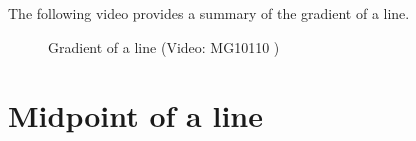         \label{m39108*eip-611}The following video provides a summary of the gradient of a line.

    \setcounter{subfigure}{0}


	\begin{figure}[H] %
    
    
    \textnormal{Gradient of a line}\vspace{.1in} \nopagebreak
  \label{m39108*yt-media1}\label{m39108*yt-video1}
             { (Video:  MG10110 )}
      
      \vspace{2pt}
    \vspace{.1in}
    
    

 \end{figure}   

    \addtocounter{footnote}{-0}
    \par 
      \label{m39108**end}
          
%     
%     
%     
    
    
    
  
      \label{m39119*uid43}
            \section{ Midpoint of a line}
            \nopagebreak
            
        

